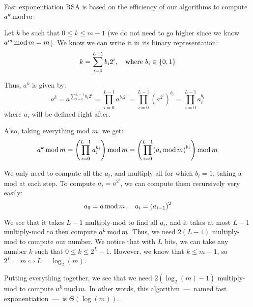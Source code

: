 \documentclass[a4paper]{article}
\begin{document}
\begin{parag}{Fast exponentiation}
    RSA is based on the efficiency of our algorithms to compute $a^k \operatorname{mod} m$. 

    Let $k$ be such that $0 \leq k \leq m-1$ (we do not need to go higher since we know $a^{m} \operatorname{mod} m = m$). We know we can write it in its binary representation: 
    \[k = \sum_{i=0}^{L-1} b_i 2^{i}, \mathspace \text{where } b_i \in \left\{0, 1\right\}\]
    
    Thus, $a^k$ is given by: 
    \[a^k = a^{\sum_{i=0}^{L-1} b_i 2^i} = \prod_{i=0}^{L-1} a^{b_i 2^i} = \prod_{i=0}^{L - 1} \left(a^{2^i}\right)^{b_i} = \prod_{i=0}^{L - 1}  a_i^{b_i}\]
    where $a_i$ will be defined right after.

    Also, taking everything mod $m$, we get: 
    \[a^k \Mod m = \left(\prod_{i=0}^{L-1} a_i^{b_i}\right) \Mod m = \left(\prod_{i=0}^{L-1} \left(a_i \Mod m\right)^{b_i}\right) \Mod m\]
    
    We only need to compute all the $a_i$, and multiply all for which $b_i = 1$, taking a mod at each step. To compute $a_i = a^{2^{i}}$, we can compute them recursively very easily: 
    \[a_0 = a \Mod m, \mathspace a_i = \left(a_{i-1}\right)^2\]
    
    We see that it takes $L-1$ multiply-mod to find all $a_i$, and it takes at most $L-1$ multiply-mod to then compute $a^k \operatorname{mod} m$. Thus, we need $2\left(L-1\right)$ multiply-mod to compute our number. We notice that with $L$ bits, we can take any number $k$ such that $0 \leq k \leq 2^L - 1$. However, we know that $k \leq m - 1$, so $2^L = m \iff L = \log_2\left(m\right)$.

    Putting everything together, we see that we need $2\left(\log_2\left(m\right) - 1\right)$ multiply-mod to compute $a^k \operatorname{mod} m$. In other words, this algorithm~---~named fast exponentiation~---~is $\Theta\left(\log\left(m\right)\right)$.
\end{parag}
\end{document}

